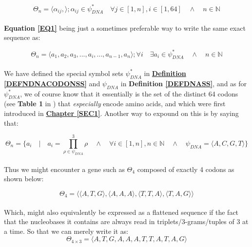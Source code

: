 \documentclass[a4paper, 18pt]{book} %
\begin{document}
\begin{equation}
\label{EQ1}
\Theta_n = \langle \alpha_{ij}, \rangle ;
\alpha_{ij} \in \psi_{DNA}^* \quad \forall j \in [1,n],  i \in [1,64] \quad \land \quad n \in \mathbb{N}
\end{equation}\\

\textbf{Equation \ref{EQ1}} being just a sometimes preferable way to write the same exact sequence as:
 
 
 \begin{equation}
\label{EQ2}
\Theta_n = \langle a_1,a_2,a_3,...,a_i,...,a_{n-1},a_n \rangle ;
\forall i \quad \exists a_i \in \psi_{DNA}^* \quad \land \quad n \in \mathbb{N}
\end{equation}\\

We have defined the special symbol sets $\psi_{DNA}^*$ in \textbf{\hyperref[DEFNDNACODONSS]{Definition \ref{DEFNDNACODONSS}}} and  $\psi_{DNA}$ in \textbf{Definition \ref{DEFDNASS}}, and as for $\psi_{DNA}^*$, we of course know that it essentially is the set of the distinct 64 codons (see \textbf{Table 1} in \cite{gregory1987oxford}) that \textit{especially} encode amino acids, and which were first introduced in \textbf{\hyperref[SEC1]{Chapter \ref{SEC1}}}. Another way to expound on this is by saying that:

 \begin{equation}
\label{EQ3}
\Theta_n = \{a_i \quad | \quad a_i = \prod\limits_{\rho \in \psi_{DNA}}^3 \rho \quad \land \quad \forall i \in [1,n], n \in \mathbb{N} \quad \land \quad \psi_{DNA} = \langle A, C, G, T \rangle\}
\end{equation}\\

Thus we might encounter a gene such as $\Theta_4$ composed of exactly 4 codons as shown below:

 \begin{equation}
\label{EQ4}
\Theta_4 = \langle \langle A, T, G \rangle, \langle A, A, A \rangle, \langle T, T, A \rangle, \langle T, A, G \rangle \rangle
\end{equation}\\

Which, might also equivalently be expressed as a flattened sequence if the fact that the nucleobases it contains are always read in triplets/3-grams/tuples of 3 at a time. So that we can merely write it as:\\

 \begin{equation}
\label{EQ5}
\Theta_{4 \times 3} = \langle  A, T, G, A, A, A, T, T, A, T, A, G \rangle
\end{equation}\\
\end{document}
